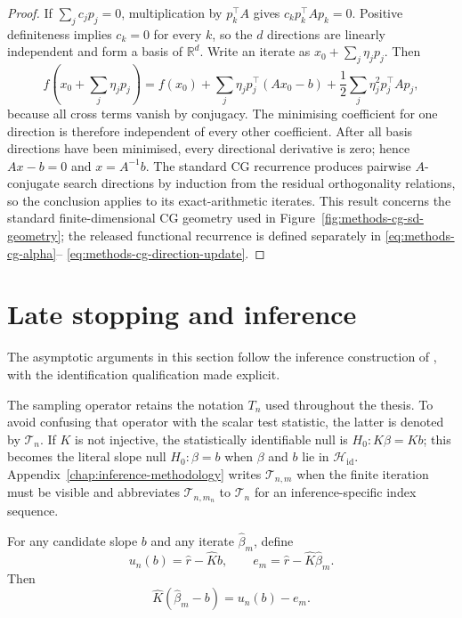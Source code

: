 \begin{proof}
If $\sum_jc_jp_j=0$, multiplication by $p_k^\top A$ gives
$c_kp_k^\top Ap_k=0$.  Positive definiteness implies $c_k=0$ for every $k$,
so the $d$ directions are linearly independent and form a basis of
$\mathbb R^d$.  Write an iterate as
$x_0+\sum_j\eta_jp_j$.  Then
\[
 f\!\left(x_0+\sum_j\eta_jp_j\right)
 =f(x_0)+\sum_j\eta_jp_j^\top(Ax_0-b)
  +\frac12\sum_j\eta_j^2p_j^\top Ap_j,
\]
because all cross terms vanish by conjugacy.  The minimising coefficient for
one direction is therefore independent of every other coefficient.  After
all basis directions have been minimised, every directional derivative is
zero; hence $Ax-b=0$ and $x=A^{-1}b$.  The standard CG recurrence produces
pairwise $A$-conjugate search directions by induction from the residual
orthogonality relations, so the conclusion applies to its exact-arithmetic
iterates.  This result concerns the standard finite-dimensional CG geometry
used in Figure~\ref{fig:methods-cg-sd-geometry}; the released functional
recurrence is defined separately in \eqref{eq:methods-cg-alpha}--
\eqref{eq:methods-cg-direction-update}.
\end{proof}

\section{Late stopping and inference}
\label{sec:app-inference-proofs}

The asymptotic arguments in this section follow the inference construction of
\textcite{babii_carrasco_tsafack_2026}, with the identification qualification
made explicit.

The sampling operator retains the notation $T_n$ used throughout the
thesis.  To avoid confusing that operator with the scalar test statistic,
the latter is denoted by $\mathcal T_n$.  If $K$ is not injective, the
statistically identifiable null is $H_0:K\beta=Kb$; this becomes the literal
slope null $H_0:\beta=b$ when $\beta$ and $b$ lie in
$\mathcal H_{\mathrm{id}}$.  Appendix~\ref{chap:inference-methodology} writes
$\mathcal T_{n,m}$ when the finite iteration must be visible and abbreviates
$\mathcal T_{n,m_n}$ to $\mathcal T_n$ for an inference-specific index
sequence.

\begin{proposition}
\label{prop:app-inference-decomposition}
For any candidate slope $b$ and any iterate $\widehat\beta_m$, define
\[
 u_n(b)=\widehat r-\widehat Kb,
 \qquad
 e_m=\widehat r-\widehat K\widehat\beta_m.
\]
Then
\[
 \widehat K(\widehat\beta_m-b)=u_n(b)-e_m.
\]
\end{proposition}

